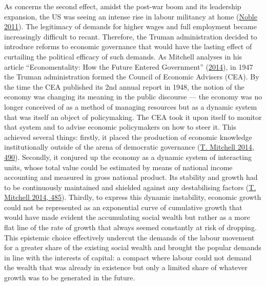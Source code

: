 \documentclass[a4paper, nobind]{templates/ociamthesis}
\begin{document}
As concerns the second effect, amidst the post-war boom and its leadership expansion, the US was seeing an intense rise in labour militancy at home (\protect\hyperlink{ref-noble_forces_2011}{Noble 2011}). The legitimacy of demands for higher wages and full employment became increasingly difficult to recant. Therefore, the Truman administration decided to introduce reforms to economic governance that would have the lasting effect of curtailing the political efficacy of such demands. As Mitchell analyses in his article ``Economentality: How the Future Entered Government'' (\protect\hyperlink{ref-mitchell_economentality_2014}{2014}), in 1947 the Truman administration formed the Council of Economic Advisers (CEA). By the time the CEA published its 2nd annual report in 1948, the notion of the economy was changing its meaning in the public discourse --- the economy was no longer conceived of as a method of managing resources but as a dynamic system that was itself an object of policymaking. The CEA took it upon itself to monitor that system and to advise economic policymakers on how to steer it. This achieved several things: firstly, it placed the production of economic knowledge institutionally outside of the arena of democratic governance (\protect\hyperlink{ref-mitchell_economentality_2014}{T. Mitchell 2014, 490}). Secondly, it conjured up the economy as a dynamic system of interacting units, whose total value could be estimated by means of national income accounting and measured in gross national product. Its stability and growth had to be continuously maintained and shielded against any destabilising factors (\protect\hyperlink{ref-mitchell_economentality_2014}{T. Mitchell 2014, 485}). Thirdly, to express this dynamic instability, economic growth could not be represented as an exponential curve of cumulative growth that would have made evident the accumulating social wealth but rather as a more flat line of the rate of growth that always seemed constantly at risk of dropping. This epistemic choice effectively undercut the demands of the labour movement for a greater share of the existing social wealth and brought the popular demands in line with the interests of capital: a compact where labour could not demand the wealth that was already in existence but only a limited share of whatever growth was to be generated in the future.
\end{document}
